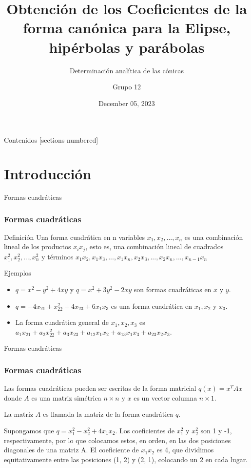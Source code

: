 \documentclass[xcolor={dvipsnames},aspectratio=169,10pt]{beamer}
\title{Obtención de los Coeficientes de la forma canónica para la Elipse, hipérbolas y parábolas}
\subtitle{Determinación analítica de las cónicas}
\author{Grupo 12}
\date{December 05, 2023}
\begin{document}
\maketitle%

\begin{frame}{Contenidos}
  [sections numbered]
  \tableofcontents[hideallsubsections]
\end{frame}

\section{Introducción}

\begin{frame}{Formas cuadráticas}
    \frametitle{Formas cuadráticas}
    \begin{block}{Definición}
      Una forma cuadrática en n variables $x_{1}, x_{2}, . . . , x_{n}$ es una combinación lineal de los
      productos $x_{i} x_{j}$, esto es, una combinación lineal de cuadrados $x_{1}^2 , x_{2}^2 , . . . , x_{n}^2$ y
      términos $x_{1}x_{2}, x_{1}x_{3}, . . . , x_{1}x_{n}, x_{2}x_{3}, . . . , x_{2}x_{n}, . . . , x_{n-1}x_{n}$
    \end{block}

  \begin{block}{Ejemplos}
    \begin{itemize}
        \item $q = x^2 - y^2 + 4xy$ y $q = x^2 + 3y^2 - 2xy$ son formas cuadráticas en $x$ y $y$.
        \item $q = -4x_{21} + x_{22}^2 + 4x_{23} + 6x_{1}x_{3}$ es una forma cuadrática en $x_{1}, x_{2}$ y $x_{3}$.
        \item La forma cuadrática general de $x_{1}, x_{2}, x_{3}$ es $a_{1}x_{21} + a_{2}x_{22}^2 + a_{3}x_{23} + a_{12}x_{1}x_{2} + a_{13}x_{1}x_{3} + a_{23}x_{2}x_{3}$.
    \end{itemize}
  \end{block}
\end{frame}

\begin{frame}{Formas cuadráticas}
  \frametitle{Formas cuadráticas}
  Las formas cuadráticas pueden ser escritas de la forma matricial $q(x) = x^{T}Ax$ donde $A$ es una matriz simétrica $n 
  \times n$ y $x$ es un vector columna $n \times 1$.

  La matriz $A$ es llamada la matriz de la forma cuadrática $q$.

  \begin{example}
    Supongamos que $q = x_1^2 - x_2^2 + 4x_1x_2$. Los coeficientes de $x_1^2$ y $x_2^2$ son 1 y -1, 
    respectivamente, por lo que colocamos estos, en orden, en las dos posiciones diagonales de una matriz A. 
    El coeficiente de $x_1x_2$ es 4, que dividimos equitativamente entre las posiciones (1, 2) y (2, 1), 
    colocando un 2 en cada lugar.
  \end{example}
\end{frame}
\end{document}
